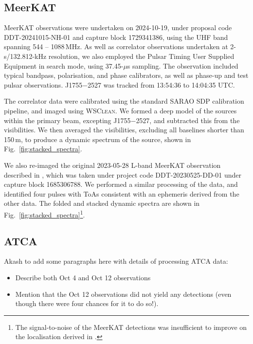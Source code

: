 \documentclass[fleqn,usenatbib]{mnras}
\newcommand{\todo}[1]{{\color{red}#1}}
\newcommand{\src}{J1755$-$2527}
\newcommand{\Fig}{Fig.}
\begin{document}
\subsection{MeerKAT} \label{sec:meerkat}

MeerKAT observations were undertaken on 2024-10-19, under proposal code DDT-20241015-NH-01 and capture block 1729341386, using the UHF band spanning 544 -- 1088\,MHz.
As well as correlator observations undertaken at 2-s/132.812-kHz resolution, we also employed the Pulsar Timing User Supplied Equipment \citep[PTUSE;][]{2020PASA...37...28B} in search mode, using 37.45-$\mu$s sampling. The observation included typical bandpass, polarisation, and phase calibrators, as well as phase-up and test pulsar observations. \src{} was tracked from 13:54:36 to 14:04:35 UTC.

The correlator data were calibrated using the standard SARAO SDP calibration pipeline, and imaged using \textsc{WSClean}. We formed a deep model of the sources within the primary beam, excepting \src{}, and subtracted this from the visibilities. We then averaged the visibilities, excluding all baselines shorter than 150\,m, to produce a dynamic spectrum of the source, shown in \Fig~\ref{fig:stacked_spectra}.

We also re-imaged the original 2023-05-28 L-band MeerKAT observation described in , which was taken under project code DDT-20230525-DD-01 under capture block 1685306788. We performed a similar processing of the data, and identified four pulses with ToAs consistent with an ephemeris derived from the other data. The folded and stacked dynamic spectra are shown in \Fig~\ref{fig:stacked_spectra}\footnote{The signal-to-noise of the MeerKAT detections was insufficient to improve on the localisation derived in .}.

\subsection{ATCA}

\todo{Akash to add some paragraphs here with details of processing ATCA data:}
\begin{itemize}
    \item Describe both Oct 4 and Oct 12 observations
    \item Mention that the Oct 12 observations did not yield any detections (even though there were four chances for it to do so!).
\end{itemize}
\end{document}
